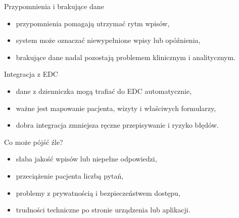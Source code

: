 \begin{frame}{Przypomnienia i brakujące dane}
  \begin{itemize}
    \item przypomnienia pomagają utrzymać rytm wpisów,
    \item system może oznaczać niewypełnione wpisy lub opóźnienia,
    \item brakujące dane nadal pozostają problemem klinicznym i analitycznym.
  \end{itemize}
\end{frame}

\begin{frame}{Integracja z EDC}
  \begin{itemize}
    \item dane z dzienniczka mogą trafiać do EDC automatycznie,
    \item ważne jest mapowanie pacjenta, wizyty i właściwych formularzy,
    \item dobra integracja zmniejsza ręczne przepisywanie i ryzyko błędów.
  \end{itemize}
\end{frame}

\begin{frame}{Co może pójść źle?}
  \begin{itemize}
    \item słaba jakość wpisów lub niepełne odpowiedzi,
    \item przeciążenie pacjenta liczbą pytań,
    \item problemy z prywatnością i bezpieczeństwem dostępu,
    \item trudności techniczne po stronie urządzenia lub aplikacji.
  \end{itemize}
\end{frame}



